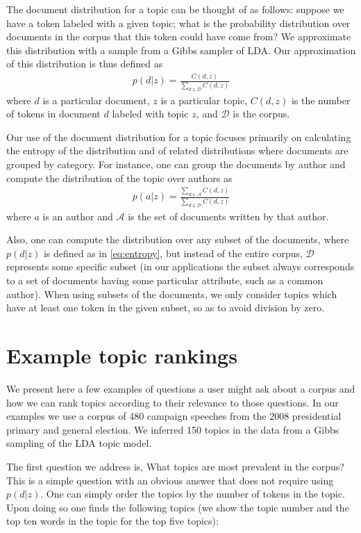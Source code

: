 \documentclass{article}
\begin{document}
The document distribution for a topic can be thought of as follows: suppose we
have a token labeled with a given topic; what is the probability distribution
over documents in the corpus that this token could have come from?  We
approximate this distribution with a sample from a Gibbs sampler of LDA.  Our
approximation of this distribution is thus defined as
\begin{align}
  \label{eq:entropy}
  p(d|z) = \frac{C(d,z)}{\sum_{d \in \mathcal{D}} C(d,z)}
\end{align}
where $d$ is a particular document, $z$ is a particular topic, $C(d,z)$ is the
number of tokens in document $d$ labeled with topic $z$, and $\mathcal{D}$ is
the corpus.

Our use of the document distribution for a topic focuses primarily on
calculating the entropy of the distribution and of related distributions where
documents are grouped by category.  For instance, one can group the documents
by author and compute the distribution of the topic over authors as
\begin{align}
  \label{eq:attrentropy}
  p(a|z) = \frac{\sum_{d \in \mathcal{A}} C(d,z)}{\sum_{d \in \mathcal{D}}
  C(d,z)}
\end{align}
where $a$ is an author and $\mathcal{A}$ is the set of documents written by
that author.

Also, one can compute the distribution over any subset of the documents, where
$p(d|z)$ is defined as in \eqref{eq:entropy}, but instead of the entire corpus,
$\mathcal{D}$ represents some specific subset (in our applications the subset
always corresponds to a set of documents having some particular attribute, such
as a common author).  When using subsets of the documents, we only consider
topics which have at least one token in the given subset, so as to avoid
division by zero.

\section{Example topic rankings}
\label{sec:examples}

We present here a few examples of questions a user might ask about a corpus and
how we can rank topics according to their relevance to those questions.  In our
examples we use a corpus of 480 campaign speeches from the 2008 presidential
primary and general election.  We inferred 150 topics in the data from a Gibbs
sampling of the LDA topic model.

The first question we address is, What topics are most prevalent in the corpus?
This is a simple question with an obvious answer that does not require using
$p(d|z)$.  One can simply order the topics by the number of tokens in the
topic.  Upon doing so one finds the following topics (we show the topic number
and the top ten words in the topic for the top five topics):
\end{document}

